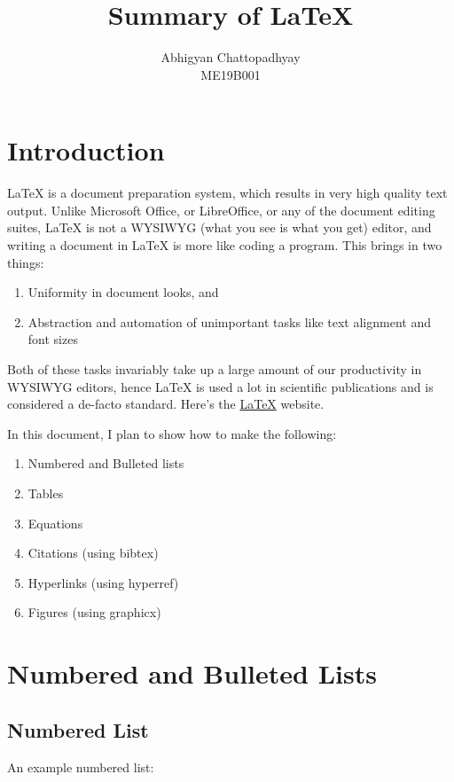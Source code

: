 \documentclass[12pt,a4paper]{article}
\title{Summary of \LaTeX{}}
\author{Abhigyan Chattopadhyay\\
ME19B001}
\begin{document}
\maketitle
\section{Introduction}
\LaTeX{} is a document preparation system, which results in very high quality text output. Unlike Microsoft Office, or LibreOffice, or any of the document editing suites, \LaTeX{} is not a WYSIWYG (what you see is what you get) editor, and writing a document in \LaTeX{} is more like coding a program. This brings in two things:

\begin{enumerate}
\item Uniformity in document looks, and
\item Abstraction and automation of unimportant tasks like text alignment and font sizes
\end{enumerate}

Both of these tasks invariably take up a large amount of our productivity in WYSIWYG editors, hence \LaTeX{} is used a lot in scientific publications and is considered a de-facto standard. Here's the \href{https://www.latex-project.org/}{\LaTeX{}} website.

In this document, I plan to show how to make the following:

\begin{enumerate}
\item Numbered and Bulleted lists
\item Tables
\item Equations
\item Citations (using bibtex)
\item Hyperlinks (using hyperref)
\item Figures (using graphicx)
\end{enumerate}

\section{Numbered and Bulleted Lists}

\subsection{Numbered List}
An example numbered list:

\end{document}
